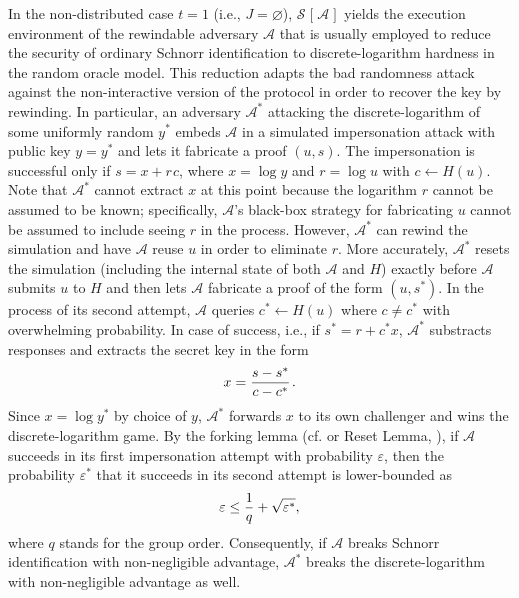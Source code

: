 \documentclass[psamsfonts, reqno]{amsart}
\theoremstyle{definition}
\theoremstyle{remark}
\numberwithin{equation}{section}
\begin{document}
In the non-distributed case $t=1$ (i.e., $J = \varnothing$),
$\mathcal{S}\hspace{1pt}[\hspace{1pt}\mathcal{A}\hspace{1pt}]$
yields the execution environment of the rewindable adversary
$\mathcal{A}$ that is usually employed to
reduce the security of ordinary Schnorr identification
to discrete-logarithm hardness in the random oracle model.
This reduction adapts the bad randomness attack
against the non-interactive version of the
protocol in order to recover the key by rewinding.
In particular, an adversary $\mathcal{A}^*$ attacking
the discrete-logarithm of some uniformly random $y^*$
embeds $\mathcal{A}$ in a simulated
impersonation attack with public key $y = y^*$
and lets it fabricate a proof $(u, s)$. The
impersonation is successful only
if $s = x + r\hspace{1pt}c$, where
$x = \log y$ and $r = \log u$ with $c \leftarrow H(u)$.
Note that $\mathcal{A}^*$ cannot extract $x$ at this
point because the logarithm $r$ cannot be assumed to be known;
specifically, $\mathcal{A}$'s black-box strategy for fabricating
$u$ cannot be assumed to include seeing $r$ in the process.
However, $\mathcal{A}^*$ can rewind the simulation
and have $\mathcal{A}$ reuse $u$ in order to eliminate $r$.
More accurately, $\mathcal{A^*}$ resets the simulation
(including the internal state of both $\mathcal{A}$ and $H$)
exactly before $\mathcal{A}$ submits $u$ to $H$
and then lets $\mathcal{A}$ fabricate
a proof of the form $(u, s^*)$.
In the process of its second attempt, $\mathcal{A}$ queries
$c^* \leftarrow H(u)$ where $c \neq c^*$ with overwhelming
probability.
In case of success, i.e., if $s^* = r + c^* x$, $\mathcal{A}^*$
substracts responses and extracts the secret key in the form
\begin{equation}\label{ordinary_extraction}
x = \frac{s - s^*}{c - c^*}\hspace{1pt}.
\vspace{5pt}
\end{equation}
Since $x = \log y^*$ by choice of $y$,
$\mathcal{A}^*$ forwards $x$ to its own challenger
and wins the discrete-logarithm game.
By the forking lemma
(cf. \cite{paper_bellare_musig}
or Reset Lemma, \cite{paper_bellare_palacio}),
if $\mathcal{A}$ succeeds in its first impersonation attempt
with probability $\varepsilon$, then the probability
$\varepsilon^*$ that it succeeds in its second attempt
is lower-bounded as
\vspace{5pt}
\begin{equation}\label{inter_probability_reduced}
\varepsilon \le \frac{1}{q} + \sqrt{\varepsilon^*},
\vspace{5pt}
\end{equation}
where $q$ stands for the group order.
Consequently, if $\mathcal{A}$ breaks Schnorr identification
with non-negligible advantage,
$\mathcal{A}^*$ breaks the discrete-logarithm
with non-negligible advantage as well.
\end{document}
